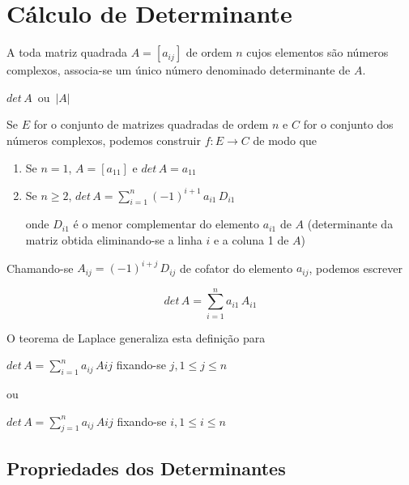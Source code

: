 \section{Cálculo de Determinante}

A toda matriz quadrada $A = [a_{ij}]$ de ordem $n$ cujos elementos são números complexos, associa-se um único número denominado determinante de $A$.

\begin{center}
$ det \, A \,$ ou $\, |A| $
\end{center}

Se $E$ for o conjunto de matrizes quadradas de ordem $n$ e $C$ for o conjunto dos números complexos, podemos construir $f: E \rightarrow C$ de modo que

\begin{enumerate}

\item Se $n = 1$, $A = [a_{11}]$ e $det \, A = a_{11}$

\item Se $ n \geq 2$, $det \, A = \displaystyle \sum_{i=1}^{n}(-1)^{i+1} \, a_{i1} \, D_{i1}$

onde $D_{i1}$ é o menor complementar do elemento $a_{i1}$ de $A$ (determinante da matriz obtida eliminando-se a linha $i$ e a coluna 1 de $A$)

\end{enumerate}

Chamando-se $ A_{ij} = (-1)^{i+j} \, D_{ij} $ de cofator do elemento $a_{ij}$, podemos escrever

\[ det \, A = \displaystyle \sum_{i=1}^{n} a_{i1} \, A_{i1} \]

O teorema de Laplace generaliza esta definição para

\begin{center}

$ det \, A = \displaystyle \sum_{i=1}^{n} a_{ij} \, A{ij} $ fixando-se $j, 1 \leq j \leq n$

\end{center}

ou

\begin{center}

$ det \, A = \displaystyle \sum_{j=1}^{n} a_{ij} \, A{ij} $ fixando-se $i, 1 \leq i \leq n$

\end{center}

\subsection{Propriedades dos Determinantes}

